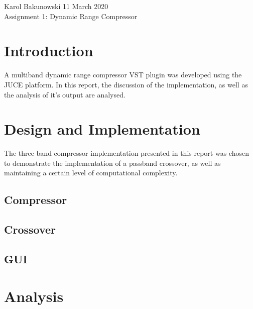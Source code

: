 \documentclass[12pt]{article}
\begin{document}
\begin{flushleft}
\normalsize
Karol Bakunowski \hfill 11 March 2020\\
\vspace{5 mm}
\Large
Assignment 1: Dynamic Range Compressor\\
\normalsize
\end{flushleft}

\section{Introduction}

A multiband dynamic range compressor VST plugin was developed using the JUCE
platform. In this report, the discussion of the implementation, as well as the
analysis of it's output are analysed.

\section{Design and Implementation}

The three band compressor implementation presented in this report was chosen to
demonstrate the implementation of a passband crossover, as well as maintaining
a certain level of computational complexity.

\subsection{Compressor}




\subsection{Crossover}




\subsection{GUI}


\section{Analysis}
\end{document}
